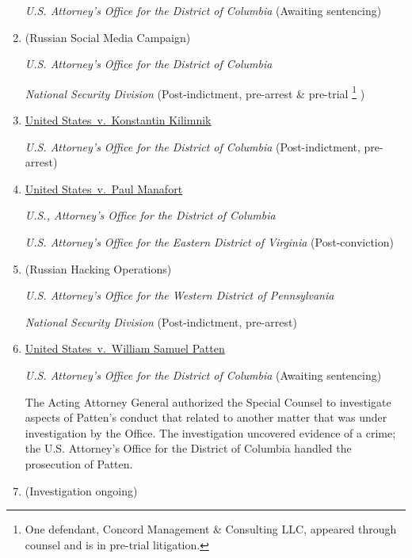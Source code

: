 \begin{enumerate}[1.]
\textit{U.S. Attorney's Office for the District of Columbia}\hfil\break
(Awaiting sentencing)

    \item {} (Russian Social Media Campaign)

\textit{U.S. Attorney's Office for the District of Columbia}

\textit{National Security Division}\hfil\break
(Post-indictment, pre-arrest \& pre-trial%
\footnote{One defendant, Concord Management \& Consulting LLC, appeared through counsel and is in pre-trial litigation.}
)

    \item \underline{United States~v.\ Konstantin Kilimnik}

\textit{U.S. Attorney's Office for the District of Columbia}\hfil\break
(Post-indictment, pre-arrest)

    \item \underline{United States~v.\ Paul Manafort}

\textit{U.S., Attorney's Office for the District of Columbia}

\textit{U.S. Attorney's Office for the Eastern District of Virginia}\hfil\break
(Post-conviction)

    \item {} (Russian Hacking Operations)

\textit{U.S. Attorney's Office for the Western District of Pennsylvania}

\textit{National Security Division}\hfil\break
(Post-indictment, pre-arrest)

    \item \underline{United States~v.\ William Samuel Patten}

\textit{U.S. Attorney's Office for the District of Columbia}\hfil\break
(Awaiting sentencing)

The Acting Attorney General authorized the Special Counsel to investigate aspects of Patten's conduct that related to another matter that was under investigation by the Office.
The investigation uncovered evidence of a crime; the U.S. Attorney's Office for the District of Columbia handled the prosecution of Patten.

    \item \underline{}

\hfil\break
(Investigation ongoing)


\end{enumerate}
